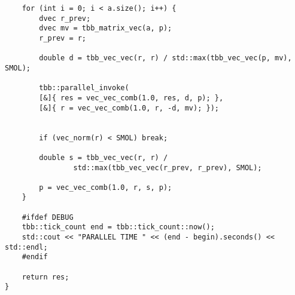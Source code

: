 \documentclass[14pt, russian]{extarticle}
\begin{document}
\begin{lstlisting}
    for (int i = 0; i < a.size(); i++) {
        dvec r_prev;
        dvec mv = tbb_matrix_vec(a, p);
        r_prev = r;

        double d = tbb_vec_vec(r, r) / std::max(tbb_vec_vec(p, mv), SMOL);

        tbb::parallel_invoke(
        [&]{ res = vec_vec_comb(1.0, res, d, p); },
        [&]{ r = vec_vec_comb(1.0, r, -d, mv); });


        if (vec_norm(r) < SMOL) break;

        double s = tbb_vec_vec(r, r) /
                std::max(tbb_vec_vec(r_prev, r_prev), SMOL);

        p = vec_vec_comb(1.0, r, s, p);
    }

    #ifdef DEBUG
    tbb::tick_count end = tbb::tick_count::now();
    std::cout << "PARALLEL TIME " << (end - begin).seconds() << std::endl;
    #endif

    return res;
}
        \end{lstlisting}
        
        
    
\end{document}
